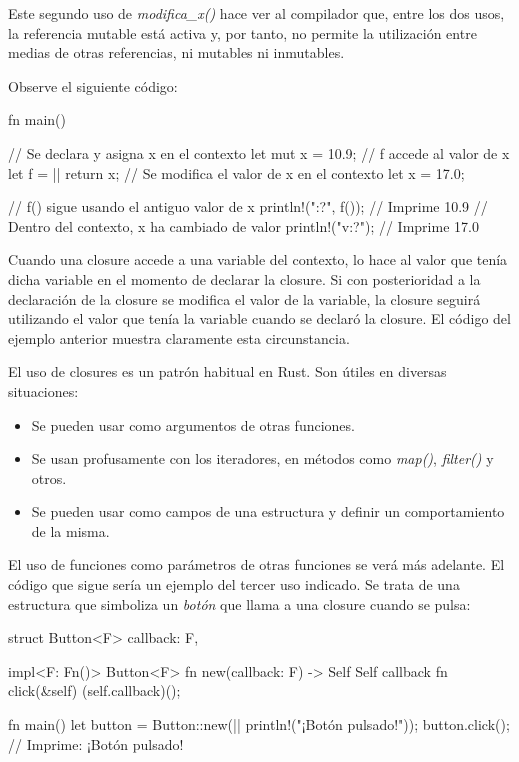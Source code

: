 Este segundo uso de \textit{modifica\_x()} hace ver al compilador que, entre los dos usos, la referencia mutable está activa y, por tanto, no permite la utilización entre medias de otras referencias, ni mutables ni inmutables.

Observe el siguiente código:

\vspace{0.7em}
\begin{Codigo}
fn main() {
   // Se declara y asigna x en el contexto
   let mut x = 10.9;
   // f accede al valor de x
   let f = || {return x};
   // Se modifica el valor de x en el contexto
   let x = 17.0;
   
   // f() sigue usando el antiguo valor de x
   println!("{:?}", f()); // Imprime 10.9
   // Dentro del contexto, x ha cambiado de valor
   println!("{v:?}");     // Imprime 17.0
}
\end{Codigo}

Cuando una closure accede a una variable del contexto, lo hace al valor que tenía dicha variable en el momento de declarar la closure. Si con posterioridad a la declaración de la closure se modifica el valor de la variable, la closure seguirá utilizando el valor que tenía la variable cuando se declaró la closure. El código del ejemplo anterior muestra claramente esta circunstancia.


El uso de closures es un patrón habitual en Rust. Son útiles en diversas situaciones:

\begin{itemize}
   \item Se pueden usar como argumentos de otras funciones.
   \vspace{0.5em}
   \item Se usan profusamente con los iteradores, en métodos como \textit{map()}, \textit{filter()} y otros.
   \vspace{0.5em}
   \item Se pueden usar como campos de una estructura y definir un comportamiento de la misma.
\end{itemize}

El uso de funciones como parámetros de otras funciones se verá más adelante. El código que sigue sería un ejemplo del tercer uso indicado. Se trata de una estructura que simboliza un \textit{botón} que llama a una closure cuando se pulsa:

\vspace{0.7em}
\begin{Codigo}
struct Button<F> {
   callback: F,
}

impl<F: Fn()> Button<F> {
   fn new(callback: F) -> Self {
      Self { callback }
   }
   fn click(&self) {
      (self.callback)();
   }
}

fn main() {
   let button = Button::new(|| println!("¡Botón pulsado!"));
   button.click();  // Imprime: ¡Botón pulsado!
}
\end{Codigo}

